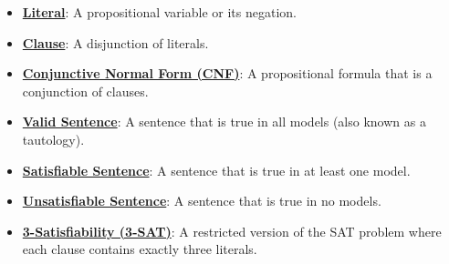 \documentclass{article}%
\begin{document}
\begin{itemize}[leftmargin=*]
\item \href{https://purdue.brightspace.com/d2l/common/assets/pdfjs-d2l-dist/1.0.14-legacy/web/viewer.html?file=%2Fcontent%2Fenforced%2F1095467-wl.202510.CS.24300.001%2F13L1-Logic.pdf%3Fou%3D1095467&lang=en-us&container=d2l-fileviewer-rendered-pdf&fullscreen=d2l-fileviewer-rendered-pdf-dialog&height=667#page=16}{\textbf{Literal}}: A propositional variable or its negation.%
\item \href{https://purdue.brightspace.com/d2l/common/assets/pdfjs-d2l-dist/1.0.14-legacy/web/viewer.html?file=%2Fcontent%2Fenforced%2F1095467-wl.202510.CS.24300.001%2F13L1-Logic.pdf%3Fou%3D1095467&lang=en-us&container=d2l-fileviewer-rendered-pdf&fullscreen=d2l-fileviewer-rendered-pdf-dialog&height=667#page=16}{\textbf{Clause}}: A disjunction of literals.%
\item \href{https://purdue.brightspace.com/d2l/common/assets/pdfjs-d2l-dist/1.0.14-legacy/web/viewer.html?file=%2Fcontent%2Fenforced%2F1095467-wl.202510.CS.24300.001%2F13L1-Logic.pdf%3Fou%3D1095467&lang=en-us&container=d2l-fileviewer-rendered-pdf&fullscreen=d2l-fileviewer-rendered-pdf-dialog&height=667#page=16}{\textbf{Conjunctive Normal Form (CNF)}}: A propositional formula that is a conjunction of clauses.%
\item \href{https://purdue.brightspace.com/d2l/common/assets/pdfjs-d2l-dist/1.0.14-legacy/web/viewer.html?file=%2Fcontent%2Fenforced%2F1095467-wl.202510.CS.24300.001%2F13L1-Logic.pdf%3Fou%3D1095467&lang=en-us&container=d2l-fileviewer-rendered-pdf&fullscreen=d2l-fileviewer-rendered-pdf-dialog&height=667#page=13}{\textbf{Valid Sentence}}: A sentence that is true in all models (also known as a tautology).%
\item \href{https://purdue.brightspace.com/d2l/common/assets/pdfjs-d2l-dist/1.0.14-legacy/web/viewer.html?file=%2Fcontent%2Fenforced%2F1095467-wl.202510.CS.24300.001%2F13L1-Logic.pdf%3Fou%3D1095467&lang=en-us&container=d2l-fileviewer-rendered-pdf&fullscreen=d2l-fileviewer-rendered-pdf-dialog&height=667#page=13}{\textbf{Satisfiable Sentence}}: A sentence that is true in at least one model.%
\item \href{https://purdue.brightspace.com/d2l/common/assets/pdfjs-d2l-dist/1.0.14-legacy/web/viewer.html?file=%2Fcontent%2Fenforced%2F1095467-wl.202510.CS.24300.001%2F13L1-Logic.pdf%3Fou%3D1095467&lang=en-us&container=d2l-fileviewer-rendered-pdf&fullscreen=d2l-fileviewer-rendered-pdf-dialog&height=667#page=13}{\textbf{Unsatisfiable Sentence}}: A sentence that is true in no models.%
\item \href{https://purdue.brightspace.com/d2l/common/assets/pdfjs-d2l-dist/1.0.14-legacy/web/viewer.html?file=%2Fcontent%2Fenforced%2F1095467-wl.202510.CS.24300.001%2F13L1-Logic.pdf%3Fou%3D1095467&lang=en-us&container=d2l-fileviewer-rendered-pdf&fullscreen=d2l-fileviewer-rendered-pdf-dialog&height=667#page=24}{\textbf{3-Satisfiability (3-SAT)}}: A restricted version of the SAT problem where each clause contains exactly three literals.%

\end{itemize}
\end{document}
